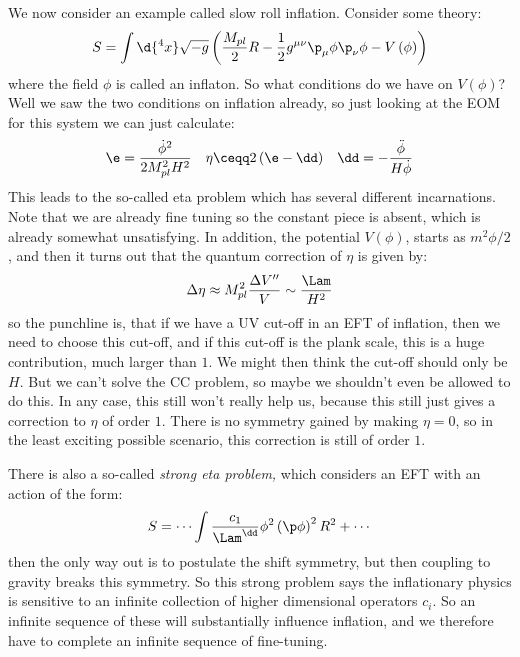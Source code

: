 \documentclass{booc}
\begin{document}
We now consider an example called slow roll inflation. Consider some theory:
\begin{equation}
S = \int \d{^4 x} \sqrt{-g} \left( \frac{M_{pl}}{2} R - 
\frac{1}{2} g^{\mu\nu} \p_\mu \phi \p_\nu \phi - V\left( \phi \right)\right)
\end{equation}
where the field $\phi$ is called an inflaton.
So what conditions do we have on $V\left( \phi \right)$?
Well we saw the two conditions on inflation already, so just 
looking at the EOM for this system we can just calculate:
\begin{align}
\e = \frac{\dot \phi^2}{2M_{pl}^2 H^2}
&&
\eta \ceqq 2\left( \e - \dd \right)
&&
\dd = -\frac{\ddot{\phi}}{H\dot \phi}
\end{align}
This leads to the so-called eta problem which has several different incarnations. 
Note that we are already fine tuning so the constant piece is absent, which is already somewhat
unsatisfying.
In addition, the potential $V\left( \phi \right)$,
starts as $m^2 \phi/ 2$, and then it turns out that the quantum correction of $\eta$ is given by:
\begin{equation}
\Delta \eta \approx M_{pl}^2 \frac{\Delta V''}{V} \sim \frac{\Lam}{H^2}
\end{equation}
so the punchline is, that
if we have a UV cut-off in an EFT of inflation, then 
we need to choose this cut-off, and if this cut-off is the plank scale, this is a huge
contribution, much larger than $1$.
We might then think the cut-off should only be $H$.
But we can't solve the CC problem, so maybe we shouldn't even be 
allowed to do this. In any case, this still won't really help us, because this still
just gives a correction to $\eta$ of order $1$. There is no symmetry gained by making $\eta = 0$, 
so in the least exciting possible scenario, this correction is still of order $1$.

There is also a so-called \emph{strong eta problem,} which considers
an EFT with an action of the form:
\begin{equation}
S = \cdots \int \frac{c_1}{\Lam^\dd} \phi^2 \left( \p \phi \right)^2 R^2 + \cdots
\end{equation}
then the only way out is to postulate the shift symmetry, but then coupling to gravity
breaks this symmetry. 
So this strong problem says the inflationary physics is sensitive to an infinite collection
of higher dimensional operators $c_i$. 
So an infinite sequence of these will substantially influence inflation, 
and we therefore have to complete an infinite sequence of fine-tuning.
\end{document}
